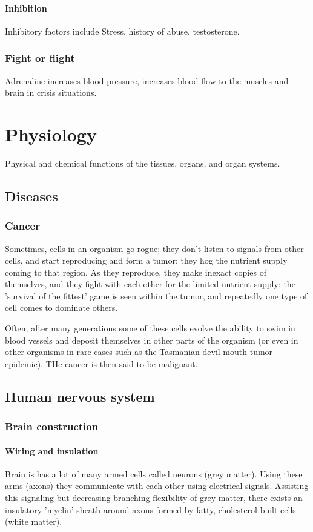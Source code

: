\documentclass[oneside, article]{memoir}
\begin{document}
\subsection{Inhibition}
Inhibitory factors include Stress, history of abuse, testosterone.

\section{Fight or flight}
Adrenaline increases blood pressure, increases blood flow to the muscles and brain in crisis situations.



\part{Physiology}
Physical and chemical functions of the tissues, organs, and organ systems.

\chapter{Diseases}
\section{Cancer}
Sometimes, cells in an organism go rogue; they don't listen to signals from other cells, and start reproducing and form a tumor; they hog the nutrient supply coming to that region. As they reproduce, they make inexact copies of themselves, and they fight with each other for the limited nutrient supply: the 'survival of the fittest' game is seen within the tumor, and repeatedly one type of cell comes to dominate others.

Often, after many generations some of these cells evolve the ability to swim in blood vessels and deposit themselves in other parts of the organism (or even in other organisms in rare cases such as the Tasmanian devil mouth tumor epidemic). THe cancer is then said to be malignant.

\chapter{Human nervous system}
\section{Brain construction}
\subsection{Wiring and insulation}
Brain is has a lot of many armed cells called neurons (grey matter). Using these arms (axons) they communicate with each other using electrical signals. Assisting this signaling but decreasing branching flexibility of grey matter, there exists an insulatory 'myelin' sheath around axons formed by fatty, cholesterol-built cells (white matter). 
\end{document}
